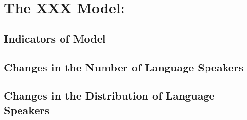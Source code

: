 \MinParskip{}

\section{The XXX Model: }


\subsection{Indicators of Model}

\subsection{Changes in the Number of Language Speakers}

\subsection{Changes in the Distribution of Language Speakers}



